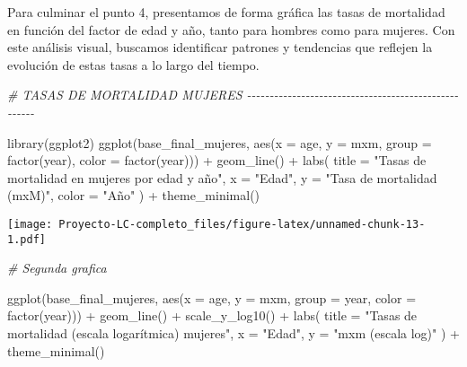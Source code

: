 \documentclass[
]{article}
\newenvironment{Shaded}{\begin{snugshade}}{\end{snugshade}}
\newcommand{\AttributeTok}[1]{\textcolor[rgb]{0.77,0.63,0.00}{#1}}
\newcommand{\CommentTok}[1]{\textcolor[rgb]{0.56,0.35,0.01}{\textit{#1}}}
\newcommand{\FunctionTok}[1]{\textcolor[rgb]{0.00,0.00,0.00}{#1}}
\newcommand{\NormalTok}[1]{#1}
\newcommand{\SpecialCharTok}[1]{\textcolor[rgb]{0.00,0.00,0.00}{#1}}
\newcommand{\StringTok}[1]{\textcolor[rgb]{0.31,0.60,0.02}{#1}}
\begin{document}
Para culminar el punto 4, presentamos de forma gráfica las tasas de
mortalidad en función del factor de edad y año, tanto para hombres como
para mujeres. Con este análisis visual, buscamos identificar patrones y
tendencias que reflejen la evolución de estas tasas a lo largo del
tiempo.

\begin{Shaded}
\begin{Highlighting}[]
\CommentTok{\# TASAS DE MORTALIDAD MUJERES {-}{-}{-}{-}{-}{-}{-}{-}{-}{-}{-}{-}{-}{-}{-}{-}{-}{-}{-}{-}{-}{-}{-}{-}{-}{-}{-}{-}{-}{-}{-}{-}{-}{-}{-}{-}{-}{-}{-}{-}{-}{-}{-}{-}{-}{-}{-}{-}{-}{-}{-}{-}{-}}

\FunctionTok{library}\NormalTok{(ggplot2)}
\FunctionTok{ggplot}\NormalTok{(base\_final\_mujeres, }\FunctionTok{aes}\NormalTok{(}\AttributeTok{x =}\NormalTok{ age, }\AttributeTok{y =}\NormalTok{ mxm, }\AttributeTok{group =} \FunctionTok{factor}\NormalTok{(year), }\AttributeTok{color =} \FunctionTok{factor}\NormalTok{(year))) }\SpecialCharTok{+}
  \FunctionTok{geom\_line}\NormalTok{() }\SpecialCharTok{+}
  \FunctionTok{labs}\NormalTok{(}
    \AttributeTok{title =} \StringTok{"Tasas de mortalidad en mujeres por edad y año"}\NormalTok{,}
    \AttributeTok{x =} \StringTok{"Edad"}\NormalTok{,}
    \AttributeTok{y =} \StringTok{"Tasa de mortalidad (mxM)"}\NormalTok{,}
    \AttributeTok{color =} \StringTok{"Año"}
\NormalTok{  ) }\SpecialCharTok{+}
  \FunctionTok{theme\_minimal}\NormalTok{()}
\end{Highlighting}
\end{Shaded}

\texttt{[image: Proyecto-LC-completo\_files/figure-latex/unnamed-chunk-13-1.pdf]}

\begin{Shaded}
\begin{Highlighting}[]
\CommentTok{\# Segunda grafica}

\FunctionTok{ggplot}\NormalTok{(base\_final\_mujeres, }\FunctionTok{aes}\NormalTok{(}\AttributeTok{x =}\NormalTok{ age, }\AttributeTok{y =}\NormalTok{ mxm, }\AttributeTok{group =}\NormalTok{ year, }\AttributeTok{color =} \FunctionTok{factor}\NormalTok{(year))) }\SpecialCharTok{+}
  \FunctionTok{geom\_line}\NormalTok{() }\SpecialCharTok{+}
  \FunctionTok{scale\_y\_log10}\NormalTok{() }\SpecialCharTok{+}
  \FunctionTok{labs}\NormalTok{(}
    \AttributeTok{title =} \StringTok{"Tasas de mortalidad (escala logarítmica) mujeres"}\NormalTok{,}
    \AttributeTok{x =} \StringTok{"Edad"}\NormalTok{,}
    \AttributeTok{y =} \StringTok{"mxm (escala log)"}
\NormalTok{  ) }\SpecialCharTok{+}
  \FunctionTok{theme\_minimal}\NormalTok{()}
\end{Highlighting}
\end{Shaded}
\end{document}
